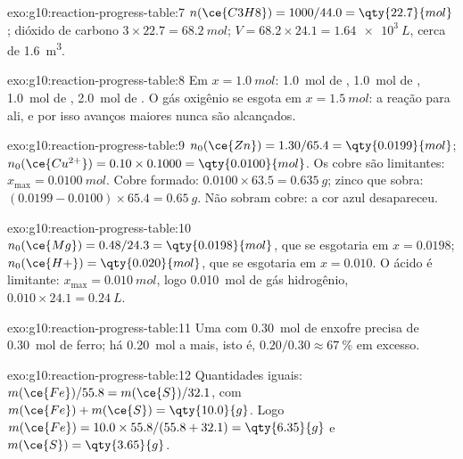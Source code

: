\begin{solution}{exo:g10:reaction-progress-table:7}
$n(\ce{C3H8}) = 1000 / 44.0 = \qty{22.7}{mol}$; dióxido de carbono
$3 \times 22.7 = \qty{68.2}{mol}$; $V = 68.2 \times 24.1 =
\qty{1.64e3}{L}$, cerca de \qty{1.6}{m^3}.
\end{solution}

\begin{solution}{exo:g10:reaction-progress-table:8}
Em $x = \qty{1.0}{mol}$: \qty{1.0}{mol} de , \qty{1.0}{mol} de
, \qty{1.0}{mol} de , \qty{2.0}{mol} de . O gás
oxigênio se esgota em $x = \qty{1.5}{mol}$: a reação para ali, e por
isso avanços maiores nunca são alcançados.
\end{solution}

\begin{solution}{exo:g10:reaction-progress-table:9}
$n_0(\ce{Zn}) = 1.30 / 65.4 = \qty{0.0199}{mol}$;
$n_0(\ce{Cu^{2+}}) = 0.10 \times 0.1000 = \qty{0.0100}{mol}$. Os 
cobre são limitantes: $x_{\max} = \qty{0.0100}{mol}$. Cobre formado:
$0.0100 \times 63.5 = \qty{0.635}{g}$; zinco que sobra:
$(0.0199 - 0.0100) \times 65.4 = \qty{0.65}{g}$. Não sobram  cobre:
a cor azul desapareceu.
\end{solution}

\begin{solution}{exo:g10:reaction-progress-table:10}
$n_0(\ce{Mg}) = 0.48 / 24.3 = \qty{0.0198}{mol}$, que se esgotaria em
$x = 0.0198$; $n_0(\ce{H+}) = \qty{0.020}{mol}$, que se esgotaria em
$x = 0.010$. O ácido é limitante: $x_{\max} = \qty{0.010}{mol}$, logo
\qty{0.010}{mol} de gás hidrogênio, $0.010 \times 24.1 = \qty{0.24}{L}$.
\end{solution}

\begin{solution}{exo:g10:reaction-progress-table:11}
Uma  com \qty{0.30}{mol} de enxofre precisa de
\qty{0.30}{mol} de ferro; há \qty{0.20}{mol} a mais, isto é,
$0.20 / 0.30 \approx \qty{67}{\percent}$ em excesso.
\end{solution}

\begin{solution}{exo:g10:reaction-progress-table:12}
Quantidades iguais: $m(\ce{Fe})/55.8 = m(\ce{S})/32.1$, com
$m(\ce{Fe}) + m(\ce{S}) = \qty{10.0}{g}$. Logo
$m(\ce{Fe}) = 10.0 \times 55.8 / (55.8 + 32.1) = \qty{6.35}{g}$ e
$m(\ce{S}) = \qty{3.65}{g}$.
\end{solution}

